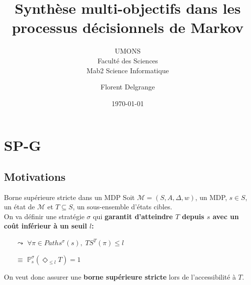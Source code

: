 \documentclass[compress]{beamer}
\title{Synthèse multi-objectifs dans les processus décisionnels de Markov} %
\author{Florent Delgrange}
\subtitle{\normalsize UMONS \\ Faculté des Sciences \\ Mab2 Science Informatique}
\date{\today}
\theoremstyle{theorem}%
\begin{document}
  \begin{frame}[plain]
    \maketitle
  \end{frame}

  \AtBeginSection[]
    {
      \begin{frame}{\contentsname}
      \vspace{-0.05\linewidth}
      \begin{multicols}{2}
      \tableofcontents[currentsection]
      \end{multicols}
      \end{frame}
    }

\section{SP-G}
\subsection{Motivations}
\begin{frame}{Borne supérieure stricte dans un MDP}
  Soit $\mathcal{M} = (S, A, \Delta, w)$, un MDP, $s \in S$, un état de $\mathcal{M}$ et $T \subseteq S$, un sous-ensemble d'états cibles.\\ On va définir une stratégie $\sigma$ qui
    \textbf{\color{fibeamer@orange}garantit d'atteindre $T$ depuis $s$ avec un coût inférieur à un seuil $l$:}
    \begin{itemize}
      \item[$\leadsto$] $\forall \pi \in Paths^\sigma(s), \; TS^T(\pi) \leq l$
      \item[$\equiv$] $\mathbb{P}_s^\sigma (\Diamond_{\leq l} T ) = 1$
    \end{itemize}
On veut donc assurer une \textbf{\color{fibeamer@orange}borne supérieure stricte}
lors de l'accessibilité à $T$.
\end{frame}
\end{document}
